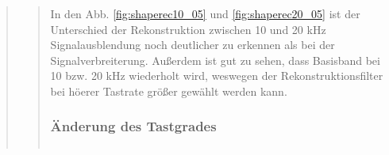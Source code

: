 \begin{quote}
\begin{quote}
        In den Abb. \ref{fig:shaperec10_05} und \ref{fig:shaperec20_05} ist der Unterschied der Rekonstruktion zwischen
        10 und 20 kHz Signalausblendung noch deutlicher zu erkennen als bei der Signalverbreiterung. Außerdem ist gut zu
        sehen, dass Basisband bei 10 bzw. 20 kHz wiederholt wird, weswegen der Rekonstruktionsfilter bei höerer Tastrate
        größer gewählt werden kann.
        
        
        \subsubsection{Änderung des Tastgrades}
        \begin{quote}
            
             
    
             
             
             
             
             
             \begin{center}
            \begin{tabular}{ll}
            

\end{tabular}
\end{center}
\end{quote}
\end{quote}
\end{quote}
